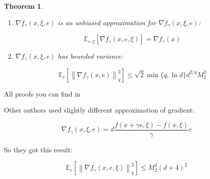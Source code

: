 \documentclass{article}
\newtheorem{theorem}{Theorem}
\begin{document}
\begin{enumerate}
\begin{theorem}
\begin{enumerate}
                    \begin{equation}
                        \label{prop_f_g_2_tpf}
                        \left\|\nabla f_{\gamma}(y, \xi) - \nabla f_{\gamma}(x, \xi)\right\|_q \leq L \left\|y - x\right\|_p,
                    \end{equation}
    
                    where $1/p + 1/q = 1$
    
                    \item[$\bullet$] $\nabla f_{\gamma}(x, \xi, e)$ is an unbiased approximation for $\nabla f_{\gamma}(x, \xi, e)$:
                    
                    \begin{equation*}
                        \mathbb{E}_{e, \xi}\left[\nabla f_{\gamma}(x, e, \xi)\right] = \nabla f_{\gamma}(x)
                    \end{equation*}
    
                    \item[$\bullet$] $\nabla f_{\gamma}(x, \xi, e)$ has bounded variance:
                    
                    \begin{equation}
                        \label{prop_nabla_f_g_2_tpf}
                        \mathbb{E}_e\left[\left\| \nabla f_{\gamma}(x, e)\right\|_q^2\right] \leq \sqrt{2} \min\{q, \ln d\} d^{2/q}M_2^2
                    \end{equation}
                \end{enumerate}
            \end{theorem}
    
            All proofs you can find in \cite{Randomized_gradient_free_methods_in_convex_optimization}
    
            Other authors \cite{nesterov2017random, nemirovskij1983problem} used slightly different approximation of gradient:
    
            \begin{equation}
                \label{other_aprox_two_point}
                \nabla f_{\gamma}(x, \xi, e) = d \dfrac{f(x+\gamma e, \xi) - f(x, \xi)}{\gamma} e
            \end{equation}
    
            So they got this result:
    
            \begin{equation*}
                \mathbb{E}_e\left[\left\| \nabla f_{\gamma}(x, e, \xi) \right\|_q^2\right] \leq M_2^2 (d+4)^2
            \end{equation*}
    

\end{enumerate}
\end{document}
